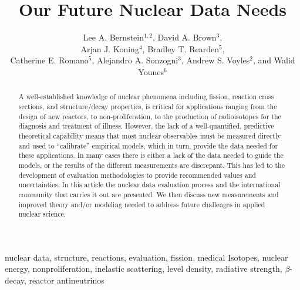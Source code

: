 \documentclass[letterpaper]{ar-1col}
\begin{document}

\title{Our Future Nuclear Data Needs}


\author{Lee A. Bernstein$^{1,2}$, David A. Brown$^3$, \\Arjan J. Koning$^4$, Bradley T. Rearden$^5$,  \\Catherine E. Romano$^5$, Alejandro A. Sonzogni$^3$, Andrew S. Voyles$^{2}$, and Walid  Younes$^6$
}

\begin{abstract}
A well-established knowledge of nuclear phenomena including fission, reaction cross sections, and structure/decay properties, is critical for applications ranging from the design of new reactors, to non-proliferation, to the production of radioisotopes for the diagnosis and treatment of illness.
However, the lack of a well-quantified, predictive theoretical capability means that most nuclear observables must be measured directly and used to \enquote{calibrate} empirical models, which in turn, provide the data needed for these applications.
 In many cases there is either a lack of the data needed to guide the models, or the results of the different measurements are discrepant.
 This has led to the development of evaluation methodologies to provide recommended values and uncertainties.
 In this article  the nuclear data evaluation process and the international community that carries it out are presented.
 We then discuss new measurements and improved theory and/or modeling needed to address future challenges in applied nuclear science. 
\end{abstract}

\begin{keywords}
nuclear data,  structure,  reactions, evaluation, fission, medical Isotopes, nuclear energy, nonproliferation, inelastic scattering, level density, radiative strength, $\beta$-decay, reactor antineutrinos
\end{keywords}
\maketitle
\end{document}
